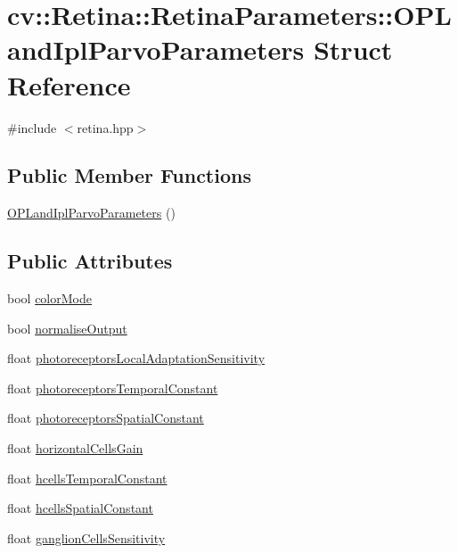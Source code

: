 \hypertarget{structcv_1_1Retina_1_1RetinaParameters_1_1OPLandIplParvoParameters}{\section{cv\-:\-:Retina\-:\-:Retina\-Parameters\-:\-:O\-P\-Land\-Ipl\-Parvo\-Parameters Struct Reference}
\label{structcv_1_1Retina_1_1RetinaParameters_1_1OPLandIplParvoParameters}
}


{\ttfamily \#include $<$retina.\-hpp$>$}

\subsection*{Public Member Functions}
\begin{DoxyCompactItemize}
\item 
\hyperlink{structcv_1_1Retina_1_1RetinaParameters_1_1OPLandIplParvoParameters_a422b02fc634250250b64b60e12a15052}{O\-P\-Land\-Ipl\-Parvo\-Parameters} ()
\end{DoxyCompactItemize}
\subsection*{Public Attributes}
\begin{DoxyCompactItemize}
\item 
bool \hyperlink{structcv_1_1Retina_1_1RetinaParameters_1_1OPLandIplParvoParameters_a6f6fb5bf18c8eec458490c18a57bf6d0}{color\-Mode}
\item 
bool \hyperlink{structcv_1_1Retina_1_1RetinaParameters_1_1OPLandIplParvoParameters_a252e6752b665b517bc780a68a612a56f}{normalise\-Output}
\item 
float \hyperlink{structcv_1_1Retina_1_1RetinaParameters_1_1OPLandIplParvoParameters_adf2ac4bbf2205e29b0a856e4eb8612b9}{photoreceptors\-Local\-Adaptation\-Sensitivity}
\item 
float \hyperlink{structcv_1_1Retina_1_1RetinaParameters_1_1OPLandIplParvoParameters_a1f7d8c1086a5a00ceb63f313af093b99}{photoreceptors\-Temporal\-Constant}
\item 
float \hyperlink{structcv_1_1Retina_1_1RetinaParameters_1_1OPLandIplParvoParameters_aaa2ecb0623d352e035ab03616147e736}{photoreceptors\-Spatial\-Constant}
\item 
float \hyperlink{structcv_1_1Retina_1_1RetinaParameters_1_1OPLandIplParvoParameters_a054cb25ef3f6568a76617273377889c1}{horizontal\-Cells\-Gain}
\item 
float \hyperlink{structcv_1_1Retina_1_1RetinaParameters_1_1OPLandIplParvoParameters_a7927b71a2d5840a6a53c8caae49eb06f}{hcells\-Temporal\-Constant}
\item 
float \hyperlink{structcv_1_1Retina_1_1RetinaParameters_1_1OPLandIplParvoParameters_a6d9ad84edc7ddd50aeefd8f68874ba36}{hcells\-Spatial\-Constant}
\item 
float \hyperlink{structcv_1_1Retina_1_1RetinaParameters_1_1OPLandIplParvoParameters_a5becd1348842ea6218054f4ace1ad2e8}{ganglion\-Cells\-Sensitivity}
\end{DoxyCompactItemize}


